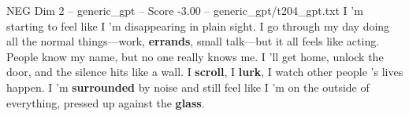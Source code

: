 \begin{textsample}{NEG Dim 2 – generic\_gpt – Score -3.00 – generic\_gpt/t204\_gpt.txt}  \label{ex:f2_neg_004}
I ’m starting to feel like I ’m disappearing in plain sight.
I go through my day doing all the normal things—work, \textbf{errands}, small talk—but it all feels like acting.
People know my name, but no one really knows me.
I ’ll get home, unlock the door, and the silence hits like a wall.
I \textbf{scroll}, I \textbf{lurk}, I watch other people ’s lives happen.
I ’m \textbf{surrounded} by noise and still feel like I ’m on the outside of everything, pressed up against the \textbf{glass}.

\end{textsample}
